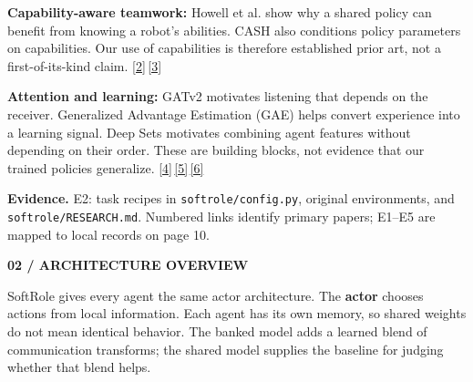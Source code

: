 \documentclass[11pt,letterpaper]{article}
\newcommand{\eyebrow}[1]{{\small\bfseries\color{teal}#1}\par\vspace{3pt}}
\newcommand{\pagetitle}[2]{\eyebrow{#1}{\fontsize{25}{28}\selectfont\bfseries #2\par}\vspace{7pt}}
\newcommand{\sub}[1]{\par\vspace{5pt}{\large\bfseries #1}\par\vspace{1pt}}
\newcommand{\evidence}[1]{\vfill{\fontsize{8.4}{10.5}\selectfont\color{muted}\textbf{Evidence.} #1\par}}
\newcommand{\code}[1]{\nolinkurl{#1}}
\newcommand{\refnum}[2]{\href{#2}{[#1]}}
\begin{document}
\sub{What we draw from other work}
\textbf{Capability-aware teamwork:} Howell et al. show why a shared policy can benefit from knowing a robot's abilities. CASH also conditions policy parameters on capabilities. Our use of capabilities is therefore established prior art, not a first-of-its-kind claim. \refnum{2}{https://proceedings.mlr.press/v229/howell23a.html}\,\refnum{3}{https://arxiv.org/abs/2501.06058}

\textbf{Attention and learning:} GATv2 motivates listening that depends on the receiver. Generalized Advantage Estimation (GAE) helps convert experience into a learning signal. Deep Sets motivates combining agent features without depending on their order. These are building blocks, not evidence that our trained policies generalize. \refnum{4}{https://arxiv.org/abs/2105.14491}\,\refnum{5}{https://arxiv.org/abs/1506.02438}\,\refnum{6}{https://papers.nips.cc/paper/2017/hash/f22e4747da1aa27e363d86d40ff442fe-Abstract.html}
\evidence{E2: task recipes in \code{softrole/config.py}, original environments, and \code{softrole/RESEARCH.md}. Numbered links identify primary papers; E1--E5 are mapped to local records on page 10.}

\newpage
\pagetitle{02 / ARCHITECTURE OVERVIEW}{One policy, different capabilities}
SoftRole gives every agent the same actor architecture. The \textbf{actor} chooses actions from local information. Each agent has its own memory, so shared weights do not mean identical behavior. The banked model adds a learned blend of communication transforms; the shared model supplies the baseline for judging whether that blend helps.

\begin{center}
\end{center}
\end{document}
